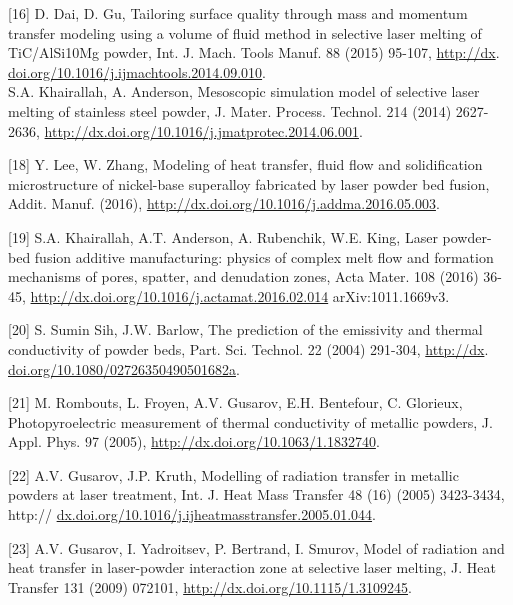 \documentclass[10pt]{article}
\begin{document}
[16] D. Dai, D. Gu, Tailoring surface quality through mass and momentum transfer modeling using a volume of fluid method in selective laser melting of TiC/AlSi10Mg powder, Int. J. Mach. Tools Manuf. 88 (2015) 95-107, \href{http://dx}{http://dx}. \href{http://doi.org/10.1016/j.ijmachtools.2014.09.010}{doi.org/10.1016/j.ijmachtools.2014.09.010}.\\
[17] S.A. Khairallah, A. Anderson, Mesoscopic simulation model of selective laser melting of stainless steel powder, J. Mater. Process. Technol. 214 (2014) 2627-2636, \href{http://dx.doi.org/10.1016/j.jmatprotec.2014.06.001}{http://dx.doi.org/10.1016/j.jmatprotec.2014.06.001}.

[18] Y. Lee, W. Zhang, Modeling of heat transfer, fluid flow and solidification microstructure of nickel-base superalloy fabricated by laser powder bed fusion, Addit. Manuf. (2016), \href{http://dx.doi.org/10.1016/j.addma.2016.05.003}{http://dx.doi.org/10.1016/j.addma.2016.05.003}.

[19] S.A. Khairallah, A.T. Anderson, A. Rubenchik, W.E. King, Laser powder-bed fusion additive manufacturing: physics of complex melt flow and formation mechanisms of pores, spatter, and denudation zones, Acta Mater. 108 (2016) 36-45, \href{http://dx.doi.org/10.1016/j.actamat.2016.02.014}{http://dx.doi.org/10.1016/j.actamat.2016.02.014} arXiv:1011.1669v3.

[20] S. Sumin Sih, J.W. Barlow, The prediction of the emissivity and thermal conductivity of powder beds, Part. Sci. Technol. 22 (2004) 291-304, \href{http://dx}{http://dx}. \href{http://doi.org/10.1080/02726350490501682a}{doi.org/10.1080/02726350490501682a}.

[21] M. Rombouts, L. Froyen, A.V. Gusarov, E.H. Bentefour, C. Glorieux, Photopyroelectric measurement of thermal conductivity of metallic powders, J. Appl. Phys. 97 (2005), \href{http://dx.doi.org/10.1063/1.1832740}{http://dx.doi.org/10.1063/1.1832740}.

[22] A.V. Gusarov, J.P. Kruth, Modelling of radiation transfer in metallic powders at laser treatment, Int. J. Heat Mass Transfer 48 (16) (2005) 3423-3434, http:// \href{http://dx.doi.org/10.1016/j.ijheatmasstransfer.2005.01.044}{dx.doi.org/10.1016/j.ijheatmasstransfer.2005.01.044}.

[23] A.V. Gusarov, I. Yadroitsev, P. Bertrand, I. Smurov, Model of radiation and heat transfer in laser-powder interaction zone at selective laser melting, J. Heat Transfer 131 (2009) 072101, \href{http://dx.doi.org/10.1115/1.3109245}{http://dx.doi.org/10.1115/1.3109245}.
\end{document}
